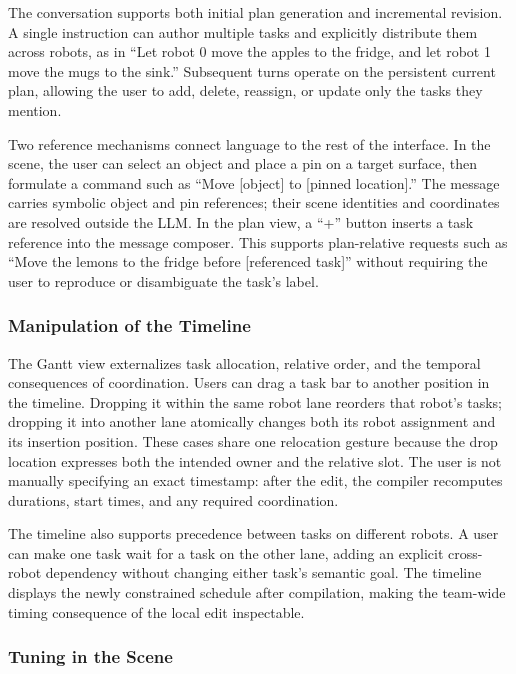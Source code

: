 The conversation supports both initial plan generation and incremental revision.
A single instruction can author multiple tasks and explicitly distribute them across robots, as in ``Let robot 0 move the apples to the fridge, and let robot 1 move the mugs to the sink.''
Subsequent turns operate on the persistent current plan, allowing the user to add, delete, reassign, or update only the tasks they mention.

Two reference mechanisms connect language to the rest of the interface.
In the scene, the user can select an object and place a pin on a target surface, then formulate a command such as ``Move [object] to [pinned location].''
The message carries symbolic object and pin references; their scene identities and coordinates are resolved outside the LLM.
In the plan view, a ``+'' button inserts a task reference into the message composer.
This supports plan-relative requests such as ``Move the lemons to the fridge before [referenced task]'' without requiring the user to reproduce or disambiguate the task's label.

\subsubsection{Manipulation of the Timeline}

The Gantt view externalizes task allocation, relative order, and the temporal consequences of coordination.
Users can drag a task bar to another position in the timeline.
Dropping it within the same robot lane reorders that robot's tasks; dropping it into another lane atomically changes both its robot assignment and its insertion position.
These cases share one relocation gesture because the drop location expresses both the intended owner and the relative slot.
The user is not manually specifying an exact timestamp: after the edit, the compiler recomputes durations, start times, and any required coordination.

The timeline also supports precedence between tasks on different robots.
A user can make one task wait for a task on the other lane, adding an explicit cross-robot dependency without changing either task's semantic goal.
The timeline displays the newly constrained schedule after compilation, making the team-wide timing consequence of the local edit inspectable.

\subsubsection{Tuning in the Scene}

